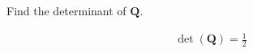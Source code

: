 Find the determinant of $\boldsymbol{Q}$.

\begin{solution}
\begin{align*}
    \det \left( \boldsymbol{Q} \right) = \frac{1}{2}
\end{align*}
\end{solution}